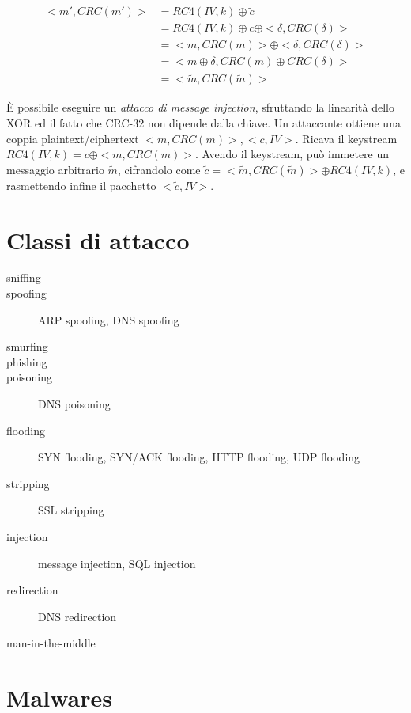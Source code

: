 \begin{equation}
\begin{split}
<m',CRC(m')> & = RC4(IV,k) \oplus \tilde{c}\\
& = RC4(IV,k) \oplus c \oplus <\delta,CRC(\delta)>\\
& = <m,CRC(m)> \oplus <\delta,CRC(\delta)>\\
& = <m \oplus \delta,CRC(m) \oplus CRC(\delta)>\\
& = <\tilde{m},CRC(\tilde{m})>
\end{split}
\end{equation}

È possibile eseguire un \textit{attacco di message injection}, sfruttando la linearità dello XOR ed il fatto che CRC-32 non dipende dalla chiave.
Un attaccante ottiene una coppia plaintext/ciphertext $<m,CRC(m)>,<c,IV>$.
Ricava il keystream $RC4(IV,k)=c \oplus <m,CRC(m)>$.
Avendo il keystream, può immetere un messaggio arbitrario $\tilde{m}$, cifrandolo come $\tilde{c}=<\tilde{m},CRC(\tilde{m})> \oplus RC4(IV,k)$, e rasmettendo infine il pacchetto $<\tilde{c},IV>$.

\section{Classi di attacco}

\begin{description}
  \item[sniffing]
  \item[spoofing] ARP spoofing, DNS spoofing
  \item[smurfing]
  \item[phishing]
  \item[poisoning] DNS poisoning
  \item[flooding] SYN flooding, SYN/ACK flooding, HTTP flooding, UDP flooding
  \item[stripping] SSL stripping
  \item[injection] message injection, SQL injection
  \item[redirection] DNS redirection
  \item[man-in-the-middle]
\end{description}

\section{Malwares}


